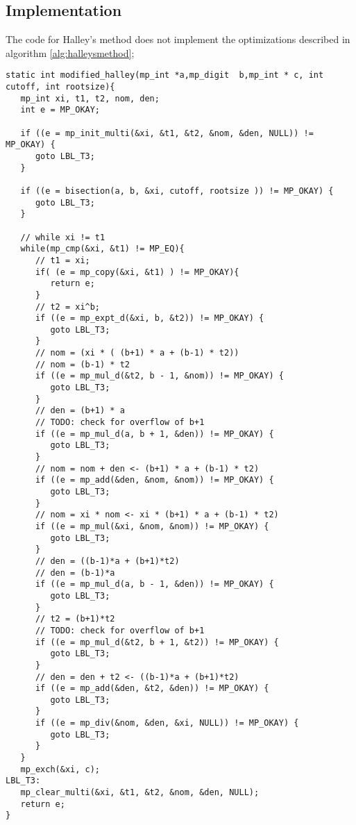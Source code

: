 \documentclass[a4paper,10pt]{report}
\theoremstyle{plain} %
\theoremstyle{definition}
\theoremstyle{remark}
\begin{document}
\subsection{Implementation}
\lstset{
        language=C,
        fontadjust=true,
        breaklines=true,
        breakatwhitespace=true,
        frame=lines,
        showstringspaces=false,
        basicstyle=\ttfamily\small,
        numbers=left,
        numberstyle=\tiny,
        stringstyle=\rmfamily\itshape
       }
The code for Halley's method does not implement the optimizations described in algorithm \ref{alg:halleysmethod};
\begin{lstlisting}
static int modified_halley(mp_int *a,mp_digit  b,mp_int * c, int cutoff, int rootsize){
   mp_int xi, t1, t2, nom, den;
   int e = MP_OKAY;

   if ((e = mp_init_multi(&xi, &t1, &t2, &nom, &den, NULL)) != MP_OKAY) {
      goto LBL_T3;
   }

   if ((e = bisection(a, b, &xi, cutoff, rootsize )) != MP_OKAY) {
      goto LBL_T3;
   }

   // while xi != t1
   while(mp_cmp(&xi, &t1) != MP_EQ){
      // t1 = xi;
      if( (e = mp_copy(&xi, &t1) ) != MP_OKAY){
         return e;
      }
      // t2 = xi^b;
      if ((e = mp_expt_d(&xi, b, &t2)) != MP_OKAY) {
         goto LBL_T3;
      }
      // nom = (xi * ( (b+1) * a + (b-1) * t2))
      // nom = (b-1) * t2
      if ((e = mp_mul_d(&t2, b - 1, &nom)) != MP_OKAY) {
         goto LBL_T3;
      }
      // den = (b+1) * a
      // TODO: check for overflow of b+1
      if ((e = mp_mul_d(a, b + 1, &den)) != MP_OKAY) {
         goto LBL_T3;
      }
      // nom = nom + den <- (b+1) * a + (b-1) * t2)
      if ((e = mp_add(&den, &nom, &nom)) != MP_OKAY) {
         goto LBL_T3;
      }
      // nom = xi * nom <- xi * (b+1) * a + (b-1) * t2)
      if ((e = mp_mul(&xi, &nom, &nom)) != MP_OKAY) {
         goto LBL_T3;
      }
      // den = ((b-1)*a + (b+1)*t2)
      // den = (b-1)*a
      if ((e = mp_mul_d(a, b - 1, &den)) != MP_OKAY) {
         goto LBL_T3;
      }
      // t2 = (b+1)*t2
      // TODO: check for overflow of b+1
      if ((e = mp_mul_d(&t2, b + 1, &t2)) != MP_OKAY) {
         goto LBL_T3;
      }
      // den = den + t2 <- ((b-1)*a + (b+1)*t2)
      if ((e = mp_add(&den, &t2, &den)) != MP_OKAY) {
         goto LBL_T3;
      }
      if ((e = mp_div(&nom, &den, &xi, NULL)) != MP_OKAY) {
         goto LBL_T3;
      }
   }
   mp_exch(&xi, c);
LBL_T3:
   mp_clear_multi(&xi, &t1, &t2, &nom, &den, NULL);
   return e;
}

\end{lstlisting}
\end{document}

